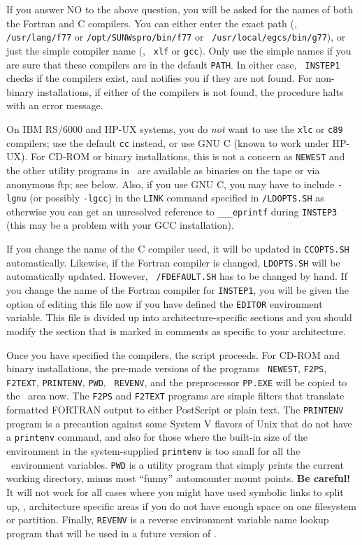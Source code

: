If you answer NO to the above question, you will be asked for the names
of both the Fortran and C compilers.  You can either enter the exact
path (\eg, {\tt /usr/lang/f77} or {\tt /opt/SUNWspro/bin/f77} or {\tt
/usr/local/egcs/bin/g77}), or just the simple compiler name (\eg, {\tt
xlf} or {\tt gcc}).  Only use the simple names if you are sure that
these compilers are in the default {\tt PATH}.  In either case, {\tt
INSTEP1} checks if the compilers exist, and notifies you if they are not
found.  For non-binary installations, if either of the compilers is not
found, the procedure halts with an error message.

On IBM RS/6000 and HP-UX systems, you do {\it not\/} want to use the
{\tt xlc} or {\tt c89} compilers; use the default {\tt cc} instead, or
use GNU C (known to work under HP-UX).  For CD-ROM or binary
installations, this is not a concern as {\tt NEWEST} and the other
utility programs in \SYSL\ are available as binaries on the tape or via
anonymous ftp; see below.  Also, if you use GNU C, you may have to
include {\tt -lgnu} (or possibly {\tt -lgcc}) in the {\tt LINK} command
specified in {\tt \SYSL/LDOPTS.SH} as otherwise you can get an
unresolved reference to {\tt \_\_\_eprintf} during {\tt INSTEP3} (this
may be a problem with your GCC installation).

If you change the name of the C compiler used, it will be updated in
{\tt CCOPTS.SH} automatically.  Likewise, if the Fortran compiler is
changed, {\tt LDOPTS.SH} will be automatically updated.  However, {\tt
\SYSU/FDEFAULT.SH} has to be changed by hand.  If you change the name of
the Fortran compiler for {\tt INSTEP1}, you will be given the option of
editing this file now if you have defined the {\tt EDITOR} environment
variable.  This file is divided up into architecture-specific sections
and you should modify the section that is marked in comments as specific
to your architecture.

Once you have specified the compilers, the script proceeds.  For CD-ROM
and binary installations, the pre-made versions of the programs {\tt
NEWEST}, {\tt F2PS}, {\tt F2TEXT}, {\tt PRINTENV}, {\tt PWD}, {\tt
REVENV}, and the preprocessor {\tt PP.EXE} will be copied to the
\SYSL\ area now.  The {\tt F2PS} and {\tt F2TEXT} programs are simple
filters that translate formatted FORTRAN output to either PostScript or
plain text.  The {\tt PRINTENV} program is a precaution against some
System V flavors of Unix that do not have a {\tt printenv} command, and
also for those where the built-in size of the environment in the
system-supplied {\tt printenv} is too small for all the
\AIPS\ environment variables.  {\tt PWD} is a utility program that
simply prints the current working directory, minus most ``funny''
automounter mount points.  {\bf Be careful!}  It will not work for all
cases where you might have used symbolic links to split up,
\eg, architecture specific areas if you do not have enough space on one
filesystem or partition.  Finally, {\tt REVENV} is a reverse environment
variable name lookup program that will be used in a future version of
\AIPS. %

